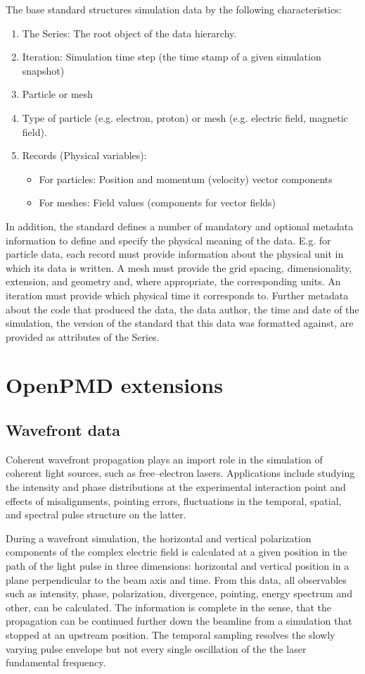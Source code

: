 \documentclass[11pt, a4paper]{article}
\begin{document}
The base standard structures simulation data by the following characteristics:
\begin{enumerate}
  \item The Series: The root object of the data hierarchy.
  \item Iteration: Simulation time step (the time stamp of a given simulation snapshot)
  \item Particle  or mesh
  \item Type of particle (e.g. electron, proton) or mesh (e.g. electric field, magnetic field).
  \item Records (Physical variables):
    \begin{itemize}
      \item For particles: Position and momentum (velocity) vector components
      \item For meshes: Field values (components for vector fields)
    \end{itemize}
\end{enumerate}
In addition, the standard defines a number of mandatory and optional metadata information to define and specify the
physical meaning of the data. E.g. for particle data, each record must provide information about the physical unit in
which its data is written. A mesh must provide the grid spacing, dimensionality, extension, and geometry and, where
appropriate, the corresponding units. An iteration must provide which physical time it corresponds to. Further metadata
about the code that produced the data, the data author, the time and date of the simulation, the version of the standard
that this data was formatted against, are provided as attributes of the Series.

\section{OpenPMD extensions}

\subsection{Wavefront data}
Coherent wavefront propagation plays an import role in the simulation of coherent light sources, such as free--electron
lasers. Applications include studying the intensity and phase distributions at the experimental interaction point and
effects of misalignments, pointing errors, fluctuations in the temporal, spatial, and spectral pulse structure on the
latter.

During a wavefront simulation, the horizontal and vertical polarization components of the complex electric field is calculated at a given position in the path of the light
pulse in three dimensions: horizontal and vertical position in a plane perpendicular to the beam axis and time. From
this data, all observables such as intensity, phase, polarization, divergence, pointing, energy spectrum and other, can
be calculated. The information is complete in the sense, that the propagation can be continued further down the
beamline from a simulation that stopped at an upstream position. The temporal sampling resolves the slowly varying pulse
envelope but not every single oscillation of the the laser fundamental frequency.
\end{document}
